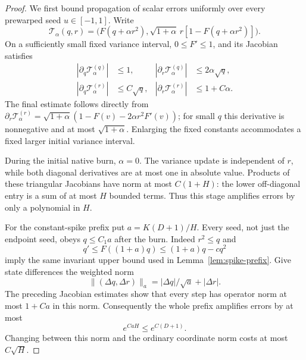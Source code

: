 \begin{proof}
We first bound propagation of scalar errors uniformly over every prewarped seed $u\in[-1,1]$. Write
\[
 \mathcal T_\alpha(q,r)=
 \bigl(F(q+\alpha r^2),\sqrt{1+\alpha}\,r[1-F(q+\alpha r^2)]\bigr).
\]
On a sufficiently small fixed variance interval, $0\le F'\le1$, and its Jacobian satisfies
\begin{align*}
 |\partial_q\mathcal T_\alpha^{(q)}|&\le1,
 &|\partial_r\mathcal T_\alpha^{(q)}|&\le2\alpha\sqrt q,\\
 |\partial_q\mathcal T_\alpha^{(r)}|&\le C\sqrt q,
 &|\partial_r\mathcal T_\alpha^{(r)}|&\le1+C\alpha.
\end{align*}
The final estimate follows directly from
$\partial_r\mathcal T_\alpha^{(r)}=\sqrt{1+\alpha}(1-F(v)-2\alpha r^2F'(v))$; for small $q$ this derivative is nonnegative and at most $\sqrt{1+\alpha}$. Enlarging the fixed constants accommodates a fixed larger initial variance interval.

During the initial native burn, $\alpha=0$. The variance update is independent of $r$, while both diagonal derivatives are at most one in absolute value. Products of these triangular Jacobians have norm at most $C(1+H)$: the lower off-diagonal entry is a sum of at most $H$ bounded terms. Thus this stage amplifies errors by only a polynomial in $H$.

For the constant-spike prefix put $a=K(D+1)/H$. Every seed, not just the endpoint seed, obeys $q\le C_1a$ after the burn. Indeed $r^2\le q$ and
\[
 q'\le F((1+a)q)\le (1+a)q-cq^2
\]
imply the same invariant upper bound used in Lemma~\ref{lem:spike-prefix}. Give state differences the weighted norm
\[
 \|(\Delta q,\Delta r)\|_a
       =|\Delta q|/\sqrt a+|\Delta r|.
\]
The preceding Jacobian estimates show that every step has operator norm at most $1+Ca$ in this norm. Consequently the whole prefix amplifies errors by at most
\[
 e^{CaH}\le e^{C(D+1)}.
\]
Changing between this norm and the ordinary coordinate norm costs at most $C\sqrt H$.


\end{proof}
